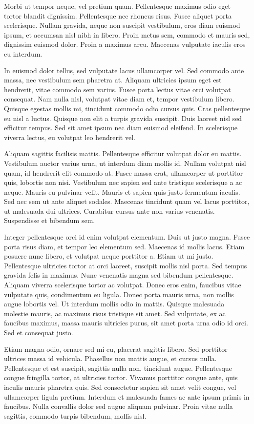 Morbi ut tempor neque, vel pretium quam. Pellentesque maximus odio eget tortor blandit dignissim. Pellentesque nec rhoncus risus. Fusce aliquet porta scelerisque. Nullam gravida, neque non suscipit vestibulum, eros diam euismod ipsum, et accumsan nisl nibh in libero. Proin metus sem, commodo et mauris sed, dignissim euismod dolor. Proin a maximus arcu. Maecenas vulputate iaculis eros eu interdum.

In euismod dolor tellus, sed vulputate lacus ullamcorper vel. Sed commodo ante massa, nec vestibulum sem pharetra at. Aliquam ultricies ipsum eget est hendrerit, vitae commodo sem varius. Fusce porta lectus vitae orci volutpat consequat. Nam nulla nisl, volutpat vitae diam et, tempor vestibulum libero. Quisque egestas mollis mi, tincidunt commodo odio cursus quis. Cras pellentesque eu nisl a luctus. Quisque non elit a turpis gravida suscipit. Duis laoreet nisl sed efficitur tempus. Sed sit amet ipsum nec diam euismod eleifend. In scelerisque viverra lectus, eu volutpat leo hendrerit vel.

Aliquam sagittis facilisis mattis. Pellentesque efficitur volutpat dolor eu mattis. Vestibulum auctor varius urna, ut interdum diam mollis id. Nullam volutpat nisl quam, id hendrerit elit commodo at. Fusce massa erat, ullamcorper ut porttitor quis, lobortis non nisi. Vestibulum nec sapien sed ante tristique scelerisque a ac neque. Mauris eu pulvinar velit. Mauris et sapien quis justo fermentum iaculis. Sed nec sem ut ante aliquet sodales. Maecenas tincidunt quam vel lacus porttitor, ut malesuada dui ultrices. Curabitur cursus ante non varius venenatis. Suspendisse et bibendum sem.

Integer pellentesque orci id enim volutpat elementum. Duis ut justo magna. Fusce porta risus diam, et tempor leo elementum sed. Maecenas id mollis lacus. Etiam posuere nunc libero, et volutpat neque porttitor a. Etiam ut mi justo. Pellentesque ultricies tortor at orci laoreet, suscipit mollis nisl porta. Sed tempus gravida felis in maximus. Nunc venenatis magna sed bibendum pellentesque. Aliquam viverra scelerisque tortor ac volutpat. Donec eros enim, faucibus vitae vulputate quis, condimentum eu ligula. Donec porta mauris urna, non mollis augue lobortis vel. Ut interdum mollis odio in mattis. Quisque malesuada molestie mauris, ac maximus risus tristique sit amet. Sed vulputate, ex ac faucibus maximus, massa mauris ultricies purus, sit amet porta urna odio id orci. Sed et consequat justo.

Etiam magna odio, ornare sed mi eu, placerat sagittis libero. Sed porttitor ultrices massa id vehicula. Phasellus non mattis augue, et cursus nulla. Pellentesque et est suscipit, sagittis nulla non, tincidunt augue. Pellentesque congue fringilla tortor, at ultricies tortor. Vivamus porttitor congue ante, quis iaculis mauris pharetra quis. Sed consectetur sapien sit amet velit congue, vel ullamcorper ligula pretium. Interdum et malesuada fames ac ante ipsum primis in faucibus. Nulla convallis dolor sed augue aliquam pulvinar. Proin vitae nulla sagittis, commodo turpis bibendum, mollis nisl.


